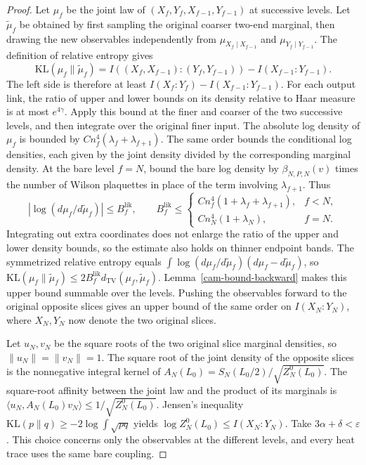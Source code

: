\documentclass[11pt,a4paper]{article}
\numberwithin{equation}{section}
\newcommand{\DTV}{d_{\mathrm{TV}}}
\begin{document}
\begin{proof}
Let \(\mu_f\) be the joint law of \((X_f,Y_f,X_{f-1},Y_{f-1})\) at successive levels. Let \(\widetilde\mu_f\) be obtained by first sampling the original coarser two-end marginal, then drawing the new observables independently from \(\mu_{X_f\mid X_{f-1}}\) and \(\mu_{Y_f\mid Y_{f-1}}\). The definition of relative entropy gives
\[
 \mathrm{KL}(\mu_f\|\widetilde\mu_f)=
 I((X_f,X_{f-1}):(Y_f,Y_{f-1}))-I(X_{f-1}:Y_{f-1}).
\]
The left side is therefore at least \(I(X_f:Y_f)-I(X_{f-1}:Y_{f-1})\). For each output link, the ratio of upper and lower bounds on its density relative to Haar measure is at most \(e^{4\gamma}\). Apply this bound at the finer and coarser of the two successive levels, and then integrate over the original finer input. The absolute log density of \(\mu_f\) is bounded by \(Cn_f^4(\lambda_f+\lambda_{f+1})\). The same order bounds the conditional log densities, each given by the joint density divided by the corresponding marginal density. At the bare level \(f=N\), bound the bare log density by \(\beta_{N,P,N}(v)\) times the number of Wilson plaquettes in place of the term involving \(\lambda_{f+1}\). Thus
\[
 \left|\log(d\mu_f/d\widetilde\mu_f)\right|
 \le B_f^{\mathrm{lik}},\qquad
 B_f^{\mathrm{lik}}\le
 \begin{cases}
 C n_f^4(1+\lambda_f+\lambda_{f+1}),& f<N,\\
 C n_N^4(1+\lambda_N),& f=N .
 \end{cases}
\]
Integrating out extra coordinates does not enlarge the ratio of the upper and lower density bounds, so the estimate also holds on thinner endpoint bands. The symmetrized relative entropy equals \(\int\log(d\mu_f/d\widetilde\mu_f)(d\mu_f-d\widetilde\mu_f)\), so \(\mathrm{KL}(\mu_f\|\widetilde\mu_f)\le2B_f^{\mathrm{lik}}\DTV(\mu_f,\widetilde\mu_f)\). Lemma~\ref{cam-bound-backward} makes this upper bound summable over the levels. Pushing the observables forward to the original opposite slices gives an upper bound of the same order on \(I(X_N:Y_N)\), where \(X_N,Y_N\) now denote the two original slices.

Let \(u_N,v_N\) be the square roots of the two original slice marginal densities, so \(\|u_N\|=\|v_N\|=1\). The square root of the joint density of the opposite slices is the nonnegative integral kernel of
\(A_N(L_0)=S_N(L_0/2)/\sqrt{Z_N^0(L_0)}\).
The square-root affinity between the joint law and the product of its marginals is
\(\langle u_N,A_N(L_0)v_N\rangle\le1/\sqrt{Z_N^0(L_0)}\).
Jensen's inequality \(\mathrm{KL}(p\|q)\ge-2\log\int\sqrt{pq}\) yields
\(\log Z_N^0(L_0)\le I(X_N:Y_N)\).
Take \(3\alpha+\delta<\varepsilon\). This choice concerns only the observables at the different levels, and every heat trace uses the same bare coupling.
\end{proof}
\end{document}

